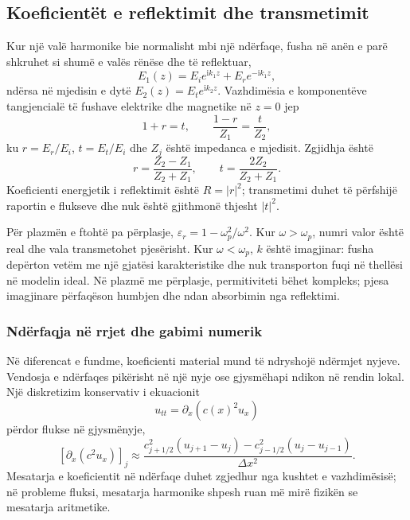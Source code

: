 \documentclass[11pt,oneside,openany]{book}
\begin{document}
\subsection{Koeficientët e reflektimit dhe transmetimit}
Kur një valë harmonike bie normalisht mbi një ndërfaqe, fusha në anën e parë shkruhet si shumë e valës rënëse dhe të reflektuar,
\begin{equation}
 E_1(z)=E_i e^{\mathrm{i}k_1z}+E_r e^{-\mathrm{i}k_1z},
\end{equation}
ndërsa në mjedisin e dytë $E_2(z)=E_t e^{\mathrm{i}k_2z}$. Vazhdimësia e komponentëve tangjencialë të fushave elektrike dhe magnetike në $z=0$ jep
\begin{equation}
 1+r=t,
 \qquad
 \frac{1-r}{Z_1}=\frac{t}{Z_2},
\end{equation}
ku $r=E_r/E_i$, $t=E_t/E_i$ dhe $Z_j$ është impedanca e mjedisit. Zgjidhja është
\begin{equation}
 r=\frac{Z_2-Z_1}{Z_2+Z_1},
 \qquad
 t=\frac{2Z_2}{Z_2+Z_1}.
\end{equation}
Koeficienti energjetik i reflektimit është $R=|r|^2$; transmetimi duhet të përfshijë raportin e flukseve dhe nuk është gjithmonë thjesht $|t|^2$.

Për plazmën e ftohtë pa përplasje, $\varepsilon_r=1-\omega_p^2/\omega^2$. Kur $\omega>\omega_p$, numri valor është real dhe vala transmetohet pjesërisht. Kur $\omega<\omega_p$, $k$ është imagjinar: fusha depërton vetëm me një gjatësi karakteristike dhe nuk transporton fuqi në thellësi në modelin ideal. Në plazmë me përplasje, permitiviteti bëhet kompleks; pjesa imagjinare përfaqëson humbjen dhe ndan absorbimin nga reflektimi.

\subsubsection{Ndërfaqja në rrjet dhe gabimi numerik}
Në diferencat e fundme, koeficienti material mund të ndryshojë ndërmjet nyjeve. Vendosja e ndërfaqes pikërisht në një nyje ose gjysmëhapi ndikon në rendin lokal. Një diskretizim konservativ i ekuacionit
\begin{equation}
 u_{tt}=\partial_x\left(c(x)^2u_x\right)
\end{equation}
përdor flukse në gjysmënyje,
\begin{equation}
 \left[\partial_x(c^2u_x)\right]_j
 \approx\frac{c_{j+1/2}^2(u_{j+1}-u_j)-c_{j-1/2}^2(u_j-u_{j-1})}{\Delta x^2}.
\end{equation}
Mesatarja e koeficientit në ndërfaqe duhet zgjedhur nga kushtet e vazhdimësisë; në probleme fluksi, mesatarja harmonike shpesh ruan më mirë fizikën se mesatarja aritmetike.
\end{document}
